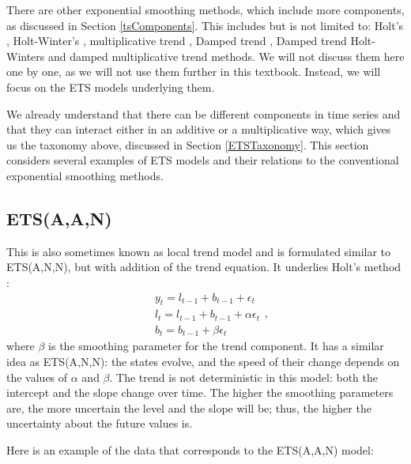 \documentclass[
]{book}
\theoremstyle{definition}
\theoremstyle{definition}
\theoremstyle{definition}
\theoremstyle{definition}
\theoremstyle{remark}
\begin{document}
There are other exponential smoothing methods, which include more components, as discussed in Section \ref{tsComponents}. This includes but is not limited to: Holt's \citep[originally proposed in 1957]{Holt2004b}, Holt-Winter's \citep{Winters1960}, multiplicative trend \citep{Pegels1969}, Damped trend \citep[originally proposed by][ and then picked up by \citet{Gardner1985a}]{Roberts1982}, Damped trend Holt-Winters \citep{Gardner1989} and damped multiplicative trend \citep{Taylor2003} methods. We will not discuss them here one by one, as we will not use them further in this textbook. Instead, we will focus on the ETS models underlying them.

We already understand that there can be different components in time series and that they can interact either in an additive or a multiplicative way, which gives us the taxonomy above, discussed in Section \ref{ETSTaxonomy}. This section considers several examples of ETS models and their relations to the conventional exponential smoothing methods.

\hypertarget{ETSAAN}{%
\subsection{ETS(A,A,N)}\label{ETSAAN}}

This is also sometimes known as local trend model and is formulated similar to ETS(A,N,N), but with addition of the trend equation. It underlies Holt's method \citep{Ord1997}:
\begin{equation}
  \begin{aligned}
    & y_{t} = l_{t-1} + b_{t-1} + \epsilon_t \\
    & l_t = l_{t-1} + b_{t-1} + \alpha \epsilon_t \\
    & b_t = b_{t-1} + \beta \epsilon_t
  \end{aligned} ,
  \label{eq:ETSAAN}
\end{equation}
where \(\beta\) is the smoothing parameter for the trend component. It has a similar idea as ETS(A,N,N): the states evolve, and the speed of their change depends on the values of \(\alpha\) and \(\beta\). The trend is not deterministic in this model: both the intercept and the slope change over time. The higher the smoothing parameters are, the more uncertain the level and the slope will be; thus, the higher the uncertainty about the future values is.

Here is an example of the data that corresponds to the ETS(A,A,N) model:
\end{document}

